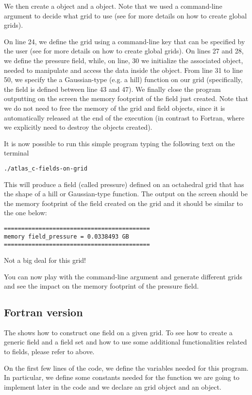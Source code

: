 We then create 
a  object and a  object.
Note that we used a command-line argument to decide 
what grid to use (see  for 
more details on how to create global grids).

On line 24, we define the grid using a command-line key 
that can be specified by the user (see 
for more details on how to create global grids).
On lines 27 and 28, we define the pressure field, while, 
on line, 30 we initialize the associated  
object, needed to manipulate and access the data inside the 
 object.
From line 31 to line 50, we specify the a Gaussian-type 
(e.g. a hill) function on our grid (specifically, the 
field is defined between line 43 and 47).
We finally close the program outputting on the screen 
the memory footprint of the field just created.
Note that we do not need to free the memory of the grid 
and field objects, since it is automatically released 
at the end of the execution (in contrast to Fortran, 
where we explicitly need to destroy the objects created).

It is now possible to run this simple program typing
the following text on the terminal
%
\begin{lstlisting}[style=BashStyle]
./atlas_c-fields-on-grid
\end{lstlisting}
% 
This will produce a field (called pressure) defined 
on an octahedral grid that has the shape of a hill 
or Gaussian-type function.
The output on the screen should be the memory footprint 
of the field created on the grid and it should be similar 
to the one below:
%
\begin{lstlisting}[style=BashStyle]
==========================================
memory field_pressure = 0.0338493 GB
==========================================
\end{lstlisting}
% 
Not a big deal for this grid!

You can now play with the command-line argument and 
generate different grids and see the impact on the 
memory footprint of the pressure field.



\subsection{Fortran version}
The  shows how to construct one field
on a given grid. To see how to create a generic field and 
a field set and how to use some additional functionalities 
related to fields, please refer to 
above. 
%

%
On the first few lines of the code, we define the variables
needed for this program. In particular, we define some constants 
needed for the function we are going to implement later in the 
code and we declare an  grid object and 
an  object.

